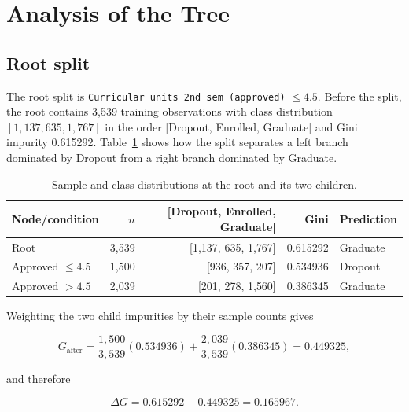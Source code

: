 
\section{Analysis of the Tree}
\label{sec:e}

\subsection{Root split}

The root split is
\texttt{Curricular units 2nd sem (approved)} $\leq 4.5$. Before the split,
the root contains 3{,}539 training observations with class distribution
$[1{,}137,635,1{,}767]$ in the order [Dropout, Enrolled, Graduate] and Gini
impurity 0.615292. Table~\ref{tab:e-root} shows how the split separates a
left branch dominated by Dropout from a right branch dominated by Graduate.

\begin{table}[H]
  \centering
  \caption{Sample and class distributions at the root and its two children.}
  \label{tab:e-root}
  \begin{tabular}{@{}lrrrl@{}}
    \toprule
    Node/condition & $n$ & [Dropout, Enrolled, Graduate] & Gini & Prediction \\
    \midrule
    Root & 3{,}539 & [1{,}137, 635, 1{,}767] & 0.615292 & Graduate \\
    Approved $\leq 4.5$ & 1{,}500 & [936, 357, 207] & 0.534936 & Dropout \\
    Approved $> 4.5$ & 2{,}039 & [201, 278, 1{,}560] & 0.386345 & Graduate \\
    \bottomrule
  \end{tabular}
\end{table}

Weighting the two child impurities by their sample counts gives

\begin{equation}
  G_{\mathrm{after}}
  = \frac{1{,}500}{3{,}539}(0.534936)
  + \frac{2{,}039}{3{,}539}(0.386345)
  = 0.449325,
  \label{eq:e-weighted-gini}
\end{equation}

and therefore

\begin{equation}
  \Delta G = 0.615292 - 0.449325 = 0.165967.
  \label{eq:e-gini-reduction}
\end{equation}

